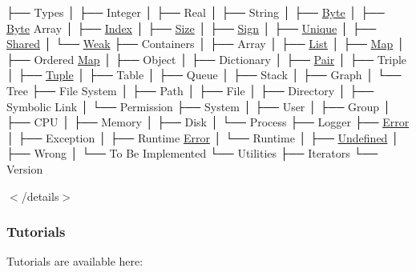 \begin{DoxyCode}
├── Types
│   ├── Integer
│   ├── Real
│   ├── String
│   ├── \hyperlink{namespaceostk_1_1core_1_1types_a0733eebee5d093ea04df859028e2649f}{Byte}
│   ├── \hyperlink{namespaceostk_1_1core_1_1types_a0733eebee5d093ea04df859028e2649f}{Byte} Array
│   ├── \hyperlink{namespaceostk_1_1core_1_1types_a6e63c1b15b2e5bc87a43771c09fa913a}{Index}
│   ├── \hyperlink{namespaceostk_1_1core_1_1types_acf68f214a245e35a7c1994c84dc56746}{Size}
│   ├── \hyperlink{namespaceostk_1_1core_1_1types_ae10e15cf66b50aaec17f4f78c984d7bf}{Sign}
│   ├── \hyperlink{namespaceostk_1_1core_1_1types_a0ff1c5e84c7c42c929044b1be97ba680}{Unique}
│   ├── \hyperlink{namespaceostk_1_1core_1_1types_a3e7aff47b81452ed1f18f6d8f6c90140}{Shared}
│   └── \hyperlink{namespaceostk_1_1core_1_1types_a0dd80951dd3139e43b5c0b3e5928d08a}{Weak}
├── Containers
│   ├── Array
│   ├── \hyperlink{namespaceostk_1_1core_1_1ctnr_a5802e21d045076175dcb310a7045c858}{List}
│   ├── \hyperlink{namespaceostk_1_1core_1_1ctnr_a2184a633cc52230b0617fab960393bc5}{Map}
│   ├── Ordered \hyperlink{namespaceostk_1_1core_1_1ctnr_a2184a633cc52230b0617fab960393bc5}{Map}
│   ├── Object
│   ├── Dictionary
│   ├── \hyperlink{namespaceostk_1_1core_1_1ctnr_a08e64f04352e3c432bff0cfd3b23923b}{Pair}
│   ├── Triple
│   ├── \hyperlink{namespaceostk_1_1core_1_1ctnr_a7f01ca040222e5b0c02a90aa68cc8e88}{Tuple}
│   ├── Table
│   ├── Queue
│   ├── Stack
│   ├── Graph
│   └── Tree
├── File System
│   ├── Path
│   ├── File
│   ├── Directory
│   ├── Symbolic Link
│   └── Permission
├── System
│   ├── User
│   ├── Group
│   ├── CPU
│   ├── Memory
│   ├── Disk
│   └── Process
├── Logger
├── \hyperlink{namespaceostk_1_1core_1_1logger_a52d02954e094391f067befffe7f3cae9a902b0d55fddef6f8d651fe1035b7d4bd}{Error}
│   ├── Exception
│   ├── Runtime \hyperlink{namespaceostk_1_1core_1_1logger_a52d02954e094391f067befffe7f3cae9a902b0d55fddef6f8d651fe1035b7d4bd}{Error}
│   └── Runtime
│       ├── \hyperlink{namespaceostk_1_1core_1_1types_ae10e15cf66b50aaec17f4f78c984d7bfaec0fc0100c4fc1ce4eea230c3dc10360}{Undefined}
│       ├── Wrong
│       └── To Be Implemented
└── Utilities
    ├── Iterators
    └── Version
\end{DoxyCode}
 

$<$/details$>$

\subsubsection*{Tutorials}

Tutorials are available here\+:


